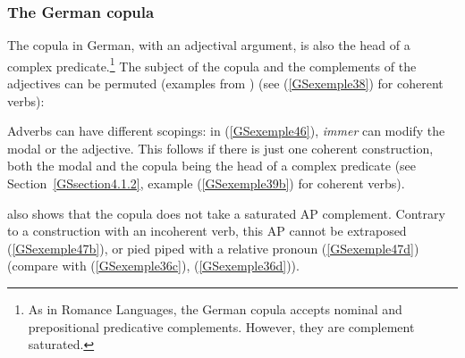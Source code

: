 \documentclass[output=paper
                ,modfonts
                ,nonflat
	        ,collection
	        ,collectionchapter
	        ,collectiontoclongg
 	        ,biblatex
                ,babelshorthands
                ,newtxmath
                ,draftmode
                ,colorlinks, citecolor=brown
]{./langsci/langscibook}
\begin{document}
{%


\subsubsection{The German copula}\label{GSsection4.1.3}

The copula in German, with an adjectival argument, is also the head of a complex predicate.\footnote{As in Romance Languages, the German copula accepts nominal and prepositional predicative complements. However, they are complement saturated.} The subject of the copula and the complements of the adjectives can be permuted (examples from \citealt{Mueller2002b, MuellerCopula}) (see (\ref{GSexemple38}) for coherent verbs):

\eal 
	\label{GSexemple45} 
    \label{GSexemple45a}

	\label{GSexemple45b}
\zl

Adverbs can have different scopings: in (\ref{GSexemple46}), \emph{immer} can modify the modal or the adjective. This follows if there is just one coherent construction, both the modal and the copula being the head of a complex predicate (see Section~\ref{GSsection4.1.2}, example (\ref{GSexemple39b}) for coherent verbs).

\z

\cite{Mueller2002b} also shows that the copula does not take a saturated AP complement. Contrary to a construction with an incoherent verb, this AP cannot be extraposed (\ref{GSexemple47b}), or pied piped with a relative pronoun (\ref{GSexemple47d}) (compare with (\ref{GSexemple36c}), (\ref{GSexemple36d})).   

}
\end{document}
